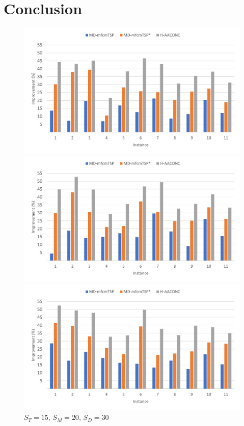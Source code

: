 \documentclass{article}
\begin{document}
	\section{Conclusion}
	\clearpage
	\onecolumn
	\begin{figure}[h]
		\centering
		\begin{minipage}{0.33\textwidth}
			\centering
			\includegraphics[scale=0.42]{small_15-15-15}\;
			\caption{$S_T=15$, $S_M=15$, $S_D=15$}
			\label{fig:15-15-15}
		\end{minipage}
		\begin{minipage}{0.33\textwidth}
			\centering
			\includegraphics[scale=0.42]{small_15-20-20}\;
			\caption{$S_T=15$, $S_M=20$, $S_D=20$}
			\label{fig:15-20-20}
		\end{minipage}
		\begin{minipage}{0.33\textwidth}
			\centering
			\includegraphics[scale=0.42]{small_15-20-30}\;
			\caption{$S_T=15$, $S_M=20$, $S_D=30$}
			\label{fig:15-20-30}
		\end{minipage}
	\end{figure}
\end{document}
